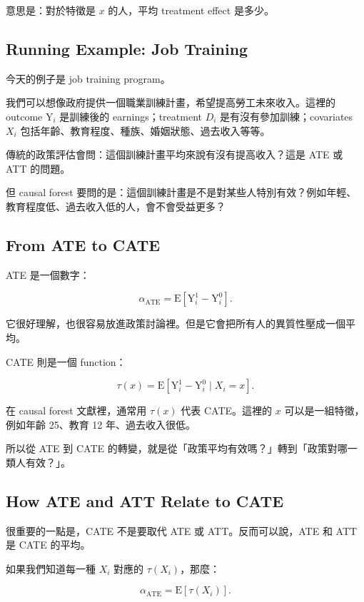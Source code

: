 \documentclass[
  chinese,
  11pt,
]{article}
\begin{document}
意思是：對於特徵是 \(x\) 的人，平均 treatment effect 是多少。

\subsection{Running Example: Job
Training}\label{running-example-job-training}

今天的例子是 job training program。

我們可以想像政府提供一個職業訓練計畫，希望提高勞工未來收入。這裡的
outcome \(\mathrm{Y}_i\) 是訓練後的 earnings；treatment \(D_i\)
是有沒有參加訓練；covariates \(X_i\)
包括年齡、教育程度、種族、婚姻狀態、過去收入等等。

傳統的政策評估會問：這個訓練計畫平均來說有沒有提高收入？這是 ATE 或 ATT
的問題。

但 causal forest
要問的是：這個訓練計畫是不是對某些人特別有效？例如年輕、教育程度低、過去收入低的人，會不會受益更多？

\subsection{From ATE to CATE}\label{from-ate-to-cate}

ATE 是一個數字：

\[
\alpha_{\text{ATE}} =
\mathrm{E}\left[\mathrm{Y}^{1}_{i}-\mathrm{Y}^{0}_{i}\right].
\]

它很好理解，也很容易放進政策討論裡。但是它會把所有人的異質性壓成一個平均。

CATE 則是一個 function：

\[
\tau(x) =
\mathrm{E}\left[\mathrm{Y}^{1}_{i}-\mathrm{Y}^{0}_{i}\mid X_i=x\right].
\]

在 causal forest 文獻裡，通常用 \(\tau(x)\) 代表 CATE。這裡的 \(x\)
可以是一組特徵，例如年齡 25、教育 12 年、過去收入很低。

所以從 ATE 到 CATE
的轉變，就是從「政策平均有效嗎？」轉到「政策對哪一類人有效？」。

\subsection{How ATE and ATT Relate to
CATE}\label{how-ate-and-att-relate-to-cate}

很重要的一點是，CATE 不是要取代 ATE 或 ATT。反而可以說，ATE 和 ATT 是
CATE 的平均。

如果我們知道每一種 \(X_i\) 對應的 \(\tau(X_i)\)，那麼：

\[
\alpha_{\text{ATE}} =
\mathrm{E}\left[\tau(X_i)\right].
\]
\end{document}
